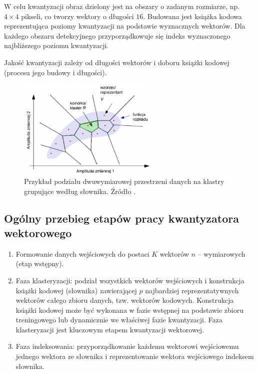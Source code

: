 \documentclass{article}
\begin{document}
W celu kwantyzacji obraz dzielony jest na obszary o zadanym rozmiarze, np. $4 \times 4$ pikseli, co tworzy wektory o długości $16$.
Budowana jest książka kodowa reprezentująca poziomy kwantyzacji na podstawie wyznacznych wektorów.
Dla każdego obszaru detekcyjnego przyporządkowuje się indeks wyznaczonego najbliższego poziomu kwantyzacji.

Jakość kwantyzacji zależy od długości wektorów i doboru książki kodowej (procesu jego budowy i długości).

\begin{figure}[H]
  \centering
  \includegraphics[width=0.6\textwidth]{images/kwantyzacja_wektorowa.png}
  \caption{Przykład podziału dwuwymiarowej przestrzeni danych na klastry grupujące według słownika. Źródło \cite{mwilczewski}.}
  \label{fig:kwantyzacja_wektorowa}
\end{figure}

\subsection{Ogólny przebieg etapów pracy kwantyzatora wektorowego}

\begin{enumerate}
  \item Formowanie danych wejściowych do postaci $K$ wektorów $n$ -- wymiarowych (etap wstępny).
  \item Faza klasteryzacji: podział wszystkich wektorów wejściowych i konstrukcja książki
        kodowej (słownika) zawierającej $p$ najbardziej reprezentatywnych wektorów całego zbioru danych,
        tzw. wektorów kodowych. Konstrukcja książki kodowej może być wykonana w fazie wstępnej na podstawie zbioru
        treningowego lub dynamicznie we właściwej fazie kwantyzacji. Faza klasteryzacji jest kluczowym etapem kwantyzacji wektorowej.
  \item Faza indeksowania: przyporządkowanie każdemu wektorowi wejściowemu jednego wektora ze słownika i reprezentowanie wektora wejściowego indeksem słownika.
\end{enumerate}
\end{document}
